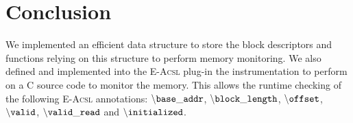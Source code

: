 \documentclass[a4paper,11pt]{article}
\begin{document}
\section{Conclusion}


We implemented an efficient data structure to store the block
descriptors and functions relying on this structure to perform memory
monitoring.
We also defined and implemented into the \textsc{E-Acsl} plug-in the
instrumentation to perform on a C source code to monitor the memory. This allows
the runtime checking of the following \textsc{E-Acsl} annotations:
${\tt \backslash base\_addr}$, ${\tt \backslash block\_length}$,
${\tt \backslash offset}$, ${\tt \backslash valid}$,
${\tt \backslash valid\_read}$ and ${\tt \backslash initialized}$.


\begin{scriptsize}


\end{scriptsize}
\end{document}
